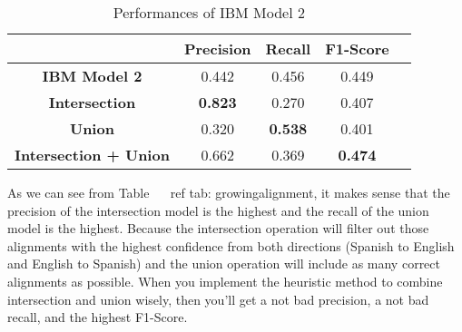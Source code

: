 \begin{table}[ht]  %
\centering  %
\caption{Performances of IBM Model 2}
\begin{tabular}{ccccc}
\hline
 &    \textbf{Precision} & \textbf{Recall} & \textbf{F1-Score}   \\
\hline
 \textbf{IBM Model 2} & 0.442 & 0.456 & 0.449 \\
 \hline
\textbf{Intersection} & \textbf{0.823} & 0.270 & 0.407 \\
\hline
\textbf{Union} & 0.320 & \textbf{0.538} & 0.401 \\
\hline
\textbf{Intersection + Union} & 0.662 & 0.369 & \textbf{0.474} \\
\hline
\end{tabular}
\label{tab:growingalignment}
\end{table}

As we can see from Table ~ \ ref {tab: growingalignment}, it makes sense that the precision of the intersection model is the highest and the recall of the union model is the highest. Because the intersection operation will filter out those alignments with the highest confidence from both directions (Spanish to English and English to Spanish) and the union operation will include as many correct alignments as possible. When you implement the heuristic method to combine intersection and union wisely, then you'll get a not bad precision, a not bad recall, and the highest F1-Score.


